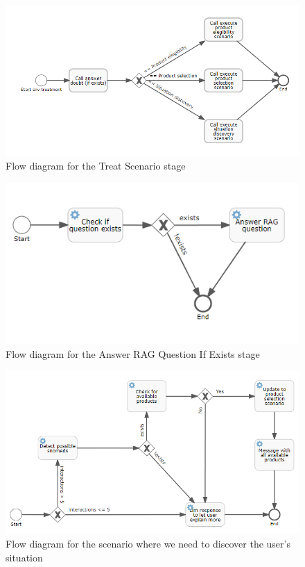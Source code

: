 \documentclass[a4paper,12pt,twoside]{ThesisStyle}
\begin{document}
\begin{figure}[htb]
  \centering
  \includegraphics[width=1\textwidth]{imatges/2_DsoTreatScenario.png}
  \caption{Flow diagram for the Treat Scenario stage}
\end{figure}

\begin{figure}[htb]
  \centering
  \includegraphics[width=1\textwidth]{imatges/3_AnswerRagQuestionIfExists.png}
  \caption{Flow diagram for the Answer RAG Question If Exists stage}
\end{figure}

\begin{figure}[htb]
  \centering
  \includegraphics[width=1\textwidth]{imatges/4_1_DsoExecuteSituationDiscoveryScenario.png}
  \caption{Flow diagram for the scenario where we need to discover the user's situation}
\end{figure}
\end{document}
